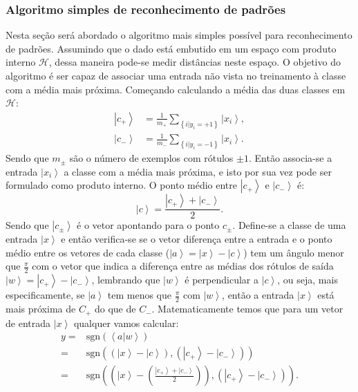 \subsubsection{Algoritmo simples de reconhecimento de padrões}

Nesta seção será abordado  o algoritmo mais simples possível para reconhecimento de padrões.  Assumindo que o dado está embutido em um espaço com produto interno $\mathcal{H}$, dessa maneira pode-se medir distâncias neste espaço. O objetivo do algoritmo é ser capaz de associar uma entrada não vista no treinamento à classe com a média mais próxima. Começando calculando a média das duas classes em $\mathcal{H}$: \begin{equation}
 \begin{split}
 \left|c_{+}\right\rangle  & =\frac{1}{m_{+}}\sum_{\left\{ i|y_{i}=+1\right\} }\left|x_{i}\right\rangle, \\
  \left|c_{-}\right\rangle  & =\frac{1}{m_{-}}\sum_{\left\{ i|y_{i}=-1\right\} }\left|x_{i}\right\rangle .
 \end{split} 
 \end{equation}
Sendo que $m_{\pm}$ são o número de exemplos com rótulos $\pm1$. Então associa-se  a entrada $\left|x_{i}\right\rangle $ a classe com a média mais próxima, e isto por sua vez pode ser formulado como produto interno. O ponto médio entre $\left|c_+\right\rangle $ e $\left|c_-\right\rangle $ é:
\begin{equation}
\left|c\right\rangle =\frac{\left|c_{+}\right\rangle +\left|c_{-}\right\rangle}{2} .
\end{equation}Sendo que $\left|c_{\pm}\right\rangle $ é o vetor apontando para o ponto $c_{\pm}$. Define-se a classe de uma entrada $\left|x\right\rangle $  e então verifica-se  se o vetor diferença entre a entrada e o ponto médio entre os vetores  de cada classe ($\left|a\right\rangle =\left|x\right\rangle -\left|c\right\rangle $)  tem um ângulo menor que $\frac{\pi}{2}$ com o vetor que indica a diferença entre as médias dos rótulos de saída $\left|w\right\rangle =\left|c_{+}\right\rangle -\left|c_{-}\right\rangle  $, lembrando que $\left|w\right\rangle $  é perpendicular a $\left|c\right\rangle $, ou seja, mais especificamente,  se $\left|a\right\rangle $ tem menos que $\frac{\pi}{2}$ com $\left|w\right\rangle $, então a entrada $\left|x\right\rangle $  está mais próxima de $C_{+}$ do que de $C_-$. Matematicamente temos que para um vetor de entrada $\left|x\right\rangle $  qualquer vamos calcular:
\begin{equation}
\begin{split}
y=&\text{sgn}\left(\left\langle a|w\right\rangle \right) \\
=& \text{sgn}\left(\left(\left|x\right\rangle -\left|c\right\rangle \right),\left(\left|c_{+}\right\rangle -\left|c_{-}\right\rangle \right)\right) \\
= &\text{sgn}\left(\left(\left|x\right\rangle -\left(\frac{\left|c_{+}\right\rangle +\left|c_{-}\right\rangle }{2}\right)\right),\left(\left|c_{+}\right\rangle -\left|c_{-}\right\rangle \right)\right).
\end{split} 
\end{equation}
